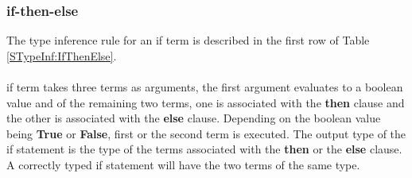 \documentclass[11pt]{article}
\begin{document}
\begin{table}
\begin{center}
\caption{Typing Rule for if-then-else, switch and where terms}
\label{STypeInf:IfThenElse}
\end{center}
\end{table}

\subsubsection {if-then-else}
The type inference rule for an {\sf if} term is described in the first row of Table \ref {STypeInf:IfThenElse}.
~~\\~~\\
{\sf if} term takes three terms as arguments, the first argument evaluates to a boolean value and of the remaining two terms, one is associated with the {\bf then} clause and the other is associated with the {\bf else} clause. Depending on the boolean value being {\bf True} or {\bf False}, first or the second term is executed. The output type of the {\sf if} statement is the type of the terms associated with the {\bf then} or the {\bf else} clause. A correctly typed {\sf if} statement will have the two terms of the same type. 
\end{document}
